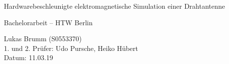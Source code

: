\documentclass[11pt, ngerman]{article}
\begin{document}
\newcommand*{\Ef}[3]{%
	\IfEqCase{#3}{%
		{+}{E_{#1}^{#2}\vert_{t+\Delta t}}%
		{-}{E_{#1}^{#2}\vert_{t-\Delta t}}%
		{0}{E_{#1}^{#2}\vert_{t}}%
		{T}{E_{#1}^{#2}\vert_{T}}%
	}[\PackageError{tree}{Undefined option to Ef: #1}{}]%
}

\newcommand*{\Hf}[3]{%
	\IfEqCase{#3}{%
		{+}{\widetilde{H_{#1}}^{#2}\vert_{t+\frac{\Delta t}{2}}}%
		{-}{\widetilde{H_{#1}}^{#2}\vert_{t-\frac{\Delta t}{2}}}%
		{0}{\widetilde{H_{#1}}^{#2}\vert_{t}}%
		{T}{\widetilde{H_{#1}}^{#2}\vert_{T}}%
	}[\PackageError{tree}{Undefined option to Hf: #1}{}]%
}

\newcommand*{\Ch}[3]{%
	\IfEqCase{#3}{%
		{+}{C_{#1}^H\vert_{t+\frac{\Delta t}{2}}^{#2}}%
		{-}{C_{#1}^H\vert_{t-\frac{\Delta t}{2}}^{#2}}%
		{0}{C_{#1}^H\vert_{t}^{#2}}%
		{T}{C_{#1}^H\vert_{T}^{#2}}%
		{T+}{C_{#1}^H\vert_{T+\frac{\Delta t}{2}}^{#2}}%
	}[\PackageError{tree}{Undefined option to Cf: #1}{}]%
}

\newcommand*{\Ce}[3]{%
	\IfEqCase{#3}{%
		{+}{C_{#1}^E\vert_{t+\frac{\Delta t}{2}}^{#2}}%
		{-}{C_{#1}^E\vert_{t-\frac{\Delta t}{2}}^{#2}}%
		{0}{C_{#1}^E\vert_{t}^{#2}}%
		{T}{C_{#1}^E\vert_{T}^{#2}}%
		{T+}{C_{#1}^E\vert_{T+\frac{\Delta t}{2}}^{#2}}%
	}[\PackageError{tree}{Undefined option to Cf: #1}{}]%
}

\newcommand*{\dt}[3]{%
	\begin{bmatrix}
		{#1} & 0 & 0\\
		0 & {#2} & 0\\
		0 & 0 & {#3}
	\end{bmatrix}
}

\newcommand*{\sgma}{\sigma^`}
\newcommand*{\sollsein}{\stackrel{!}{=}}

\newcommand*{\mone}{\frac{\sgma_y+\sgma_z}{2\epsilon_0} + \frac{\sgma_y\sgma_z\Delta t}{4\epsilon_0} + \frac{1}{\Delta t}}
\newcommand*{\fone}{-\frac{\sgma_y+\sgma_z}{2\epsilon_0} + \frac{\sgma_y\sgma_z\Delta t}{4\epsilon_0} + \frac{1}{\Delta t}}

\newcommand{\source}[1]{\caption*{Source: {#1}} }

\begin{titlepage}
	\begin{center}
		\begin{Large}Hardwarebeschleunigte elektromagnetische Simulation einer Drahtantenne\end{Large}
		\vfill
		\begin{Large}Bachelorarbeit -- HTW Berlin\end{Large}
		\vfill
		\begin{Small}Lukas Brumm (S0553370)\\1. und 2. Pr\"ufer: Udo Pursche, Heiko H\"ubert\\Datum: 11.03.19\end{Small}
	\end{center}
\end{titlepage}
\end{document}
